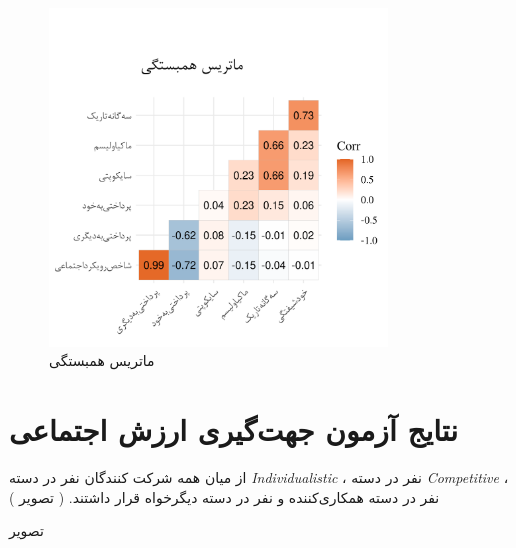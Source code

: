 % 
\begin{figure}[htpb]
    \centering
    \includegraphics[width=0.8\textwidth]{./img/CorrPlotIntervals.png}
    \caption{ماتریس همبستگی}
    \label{fig:CorrPlotIntervals}
\end{figure}

\section{نتایج آزمون جهت‌گیری ارزش اجتماعی}
از میان همه شرکت کنندگان
\noOfIndividualisticParticipants
نفر در دسته
\textit{
    \gls{Individualistic}
}
،
\noOfCompetitiveParticipants
نفر در دسته
\textit{
    \gls{Competitive}
}
،
\noOfCooperativeParticipants
نفر در دسته
همکاری‌کننده
و
\noOfAltruisticParticipants
نفر در دسته
دیگر‌خواه
قرار داشتند.
(
تصویر \label{fig:SVOAgainstPopulation}
)

تصویر \label{fig:sexualityAndSVOAgainstPopulation}


